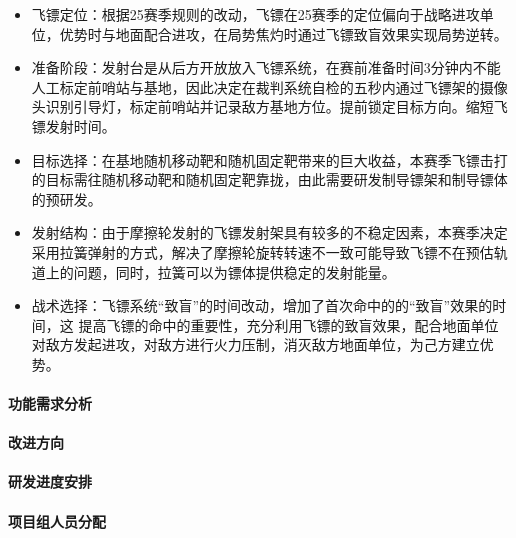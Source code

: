         \begin{itemize}
            \item 飞镖定位：根据25赛季规则的改动，飞镖在25赛季的定位偏向于战略进攻单位，优势时与地面配合进攻，在局势焦灼时通过飞镖致盲效果实现局势逆转。
            \item 准备阶段：发射台是从后方开放放入飞镖系统，在赛前准备时间3分钟内不能人工标定前哨站与基地，因此决定在裁判系统自检的五秒内通过飞镖架的摄像头识别引导灯，标定前哨站并记录敌方基地方位。提前锁定目标方向。缩短飞镖发射时间。
            \item 目标选择：在基地随机移动靶和随机固定靶带来的巨大收益，本赛季飞镖击打的目标需往随机移动靶和随机固定靶靠拢，由此需要研发制导镖架和制导镖体的预研发。
            \item 发射结构：由于摩擦轮发射的飞镖发射架具有较多的不稳定因素，本赛季决定采用拉簧弹射的方式，解决了摩擦轮旋转转速不一致可能导致飞镖不在预估轨道上的问题，同时，拉簧可以为镖体提供稳定的发射能量。
            \item 战术选择：飞镖系统“致盲”的时间改动，增加了首次命中的的“致盲”效果的时间，这	提高飞镖的命中的重要性，充分利用飞镖的致盲效果，配合地面单位对敌方发起进攻，对敌方进行火力压制，消灭敌方地面单位，为己方建立优势。
        \end{itemize}
    
    \paragraph{功能需求分析}

    
    \paragraph{改进方向}


    \paragraph{研发进度安排}


    \paragraph{项目组人员分配}

    